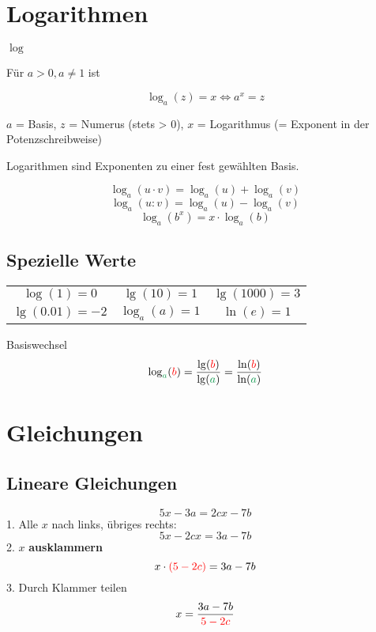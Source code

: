 \begin{multicols}{2}
\hrulefill
\section*{Logarithmen}

\begin{definition*}{$\log$}{}

Für $a>0, a\ne 1$ ist

$$\log_a{}(z)=x \Longleftrightarrow{} a^x = z$$
\end{definition*}
$a$ = Basis, $z$ = Numerus (stets > 0), $x$ = Logarithmus (= Exponent in der Potenzschreibweise)

Logarithmen sind Exponenten zu einer fest gewählten Basis.

\begin{gesetz*}{}{}
$$\log_a(u\cdot v) = \log_a(u) + \log_a(v)$$
$$\log_a(u : v) = \log_a(u) - \log_a(v)$$
$$\log_a(b^x) = x\cdot{}\log_a(b)$$
\end{gesetz*}

\subsection*{Spezielle Werte}
\begin{tabular}{ccc}
$\log(1)=0$     &    $\lg(10) = 1$ & $\lg(1000)=3$           \\
$\lg(0.01)=-2$ & $\log_a(a) = 1$   & $\ln(e) = 1$\\
\end{tabular}
\begin{gesetz*}{Basiswechsel}{}
$$\log_{\color{ForestGreen}a}({\color{red}b}) = \frac{\lg({\color{red}b})}{\lg({\color{ForestGreen}a})} = \frac{\ln({\color{red}b})}{\ln({\color{ForestGreen}a})}$$
\end{gesetz*}
\hrulefill
\section*{Gleichungen}

\subsection*{Lineare Gleichungen}
$$5x-3a = 2cx-7b$$
1. Alle $x$ nach links, übriges rechts:
$$5x - 2cx = 3a-7b$$
2. $x$ \textbf{\color{red}ausklammern}
$$x\cdot{}{\color{red}(5-2c)} = 3a-7b$$
3. Durch Klammer teilen
$$x = \frac{3a-7b}{{\color{red}5-2c}}$$



\end{multicols}
